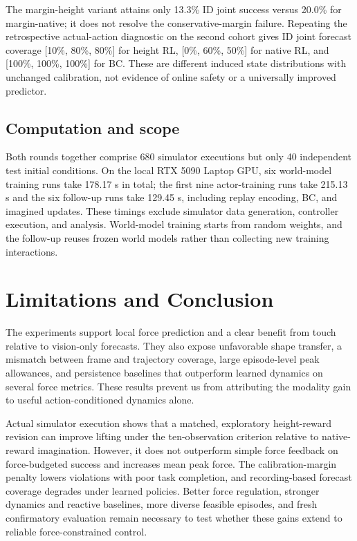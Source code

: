 \documentclass[letterpaper,10pt,conference]{ieeeconf}
\begin{document}
The margin-height variant attains only 13.3\% ID joint success versus 20.0\% for margin-native; it does not resolve the conservative-margin failure. Repeating the retrospective actual-action diagnostic on the second cohort gives ID joint forecast coverage [10\%, 80\%, 80\%] for height RL, [0\%, 60\%, 50\%] for native RL, and [100\%, 100\%, 100\%] for BC. These are different induced state distributions with unchanged calibration, not evidence of online safety or a universally improved predictor.

\subsection{Computation and scope}

Both rounds together comprise 680 simulator executions but only 40 independent test initial conditions. On the local RTX 5090 Laptop GPU, six world-model training runs take 178.17 s in total; the first nine actor-training runs take 215.13 s and the six follow-up runs take 129.45 s, including replay encoding, BC, and imagined updates. These timings exclude simulator data generation, controller execution, and analysis. World-model training starts from random weights, and the follow-up reuses frozen world models rather than collecting new training interactions.

\section{Limitations and Conclusion}

The experiments support local force prediction and a clear benefit from touch relative to vision-only forecasts. They also expose unfavorable shape transfer, a mismatch between frame and trajectory coverage, large episode-level peak allowances, and persistence baselines that outperform learned dynamics on several force metrics. These results prevent us from attributing the modality gain to useful action-conditioned dynamics alone.

Actual simulator execution shows that a matched, exploratory height-reward revision can improve lifting under the ten-observation criterion relative to native-reward imagination. However, it does not outperform simple force feedback on force-budgeted success and increases mean peak force. The calibration-margin penalty lowers violations with poor task completion, and recording-based forecast coverage degrades under learned policies. Better force regulation, stronger dynamics and reactive baselines, more diverse feasible episodes, and fresh confirmatory evaluation remain necessary to test whether these gains extend to reliable force-constrained control.
\end{document}
